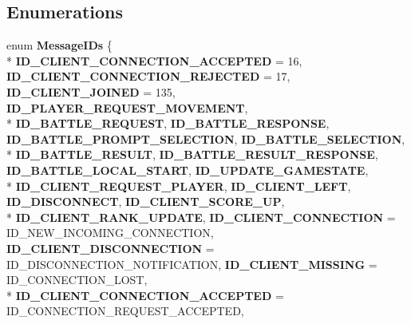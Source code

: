 \subsection*{Enumerations}
\begin{DoxyCompactItemize}
\item 
enum {\bfseries Message\-I\-Ds} \{ \\*
{\bfseries I\-D\-\_\-\-C\-L\-I\-E\-N\-T\-\_\-\-C\-O\-N\-N\-E\-C\-T\-I\-O\-N\-\_\-\-A\-C\-C\-E\-P\-T\-E\-D} = 16, 
{\bfseries I\-D\-\_\-\-C\-L\-I\-E\-N\-T\-\_\-\-C\-O\-N\-N\-E\-C\-T\-I\-O\-N\-\_\-\-R\-E\-J\-E\-C\-T\-E\-D} = 17, 
{\bfseries I\-D\-\_\-\-C\-L\-I\-E\-N\-T\-\_\-\-J\-O\-I\-N\-E\-D} = 135, 
{\bfseries I\-D\-\_\-\-P\-L\-A\-Y\-E\-R\-\_\-\-R\-E\-Q\-U\-E\-S\-T\-\_\-\-M\-O\-V\-E\-M\-E\-N\-T}, 
\\*
{\bfseries I\-D\-\_\-\-B\-A\-T\-T\-L\-E\-\_\-\-R\-E\-Q\-U\-E\-S\-T}, 
{\bfseries I\-D\-\_\-\-B\-A\-T\-T\-L\-E\-\_\-\-R\-E\-S\-P\-O\-N\-S\-E}, 
{\bfseries I\-D\-\_\-\-B\-A\-T\-T\-L\-E\-\_\-\-P\-R\-O\-M\-P\-T\-\_\-\-S\-E\-L\-E\-C\-T\-I\-O\-N}, 
{\bfseries I\-D\-\_\-\-B\-A\-T\-T\-L\-E\-\_\-\-S\-E\-L\-E\-C\-T\-I\-O\-N}, 
\\*
{\bfseries I\-D\-\_\-\-B\-A\-T\-T\-L\-E\-\_\-\-R\-E\-S\-U\-L\-T}, 
{\bfseries I\-D\-\_\-\-B\-A\-T\-T\-L\-E\-\_\-\-R\-E\-S\-U\-L\-T\-\_\-\-R\-E\-S\-P\-O\-N\-S\-E}, 
{\bfseries I\-D\-\_\-\-B\-A\-T\-T\-L\-E\-\_\-\-L\-O\-C\-A\-L\-\_\-\-S\-T\-A\-R\-T}, 
{\bfseries I\-D\-\_\-\-U\-P\-D\-A\-T\-E\-\_\-\-G\-A\-M\-E\-S\-T\-A\-T\-E}, 
\\*
{\bfseries I\-D\-\_\-\-C\-L\-I\-E\-N\-T\-\_\-\-R\-E\-Q\-U\-E\-S\-T\-\_\-\-P\-L\-A\-Y\-E\-R}, 
{\bfseries I\-D\-\_\-\-C\-L\-I\-E\-N\-T\-\_\-\-L\-E\-F\-T}, 
{\bfseries I\-D\-\_\-\-D\-I\-S\-C\-O\-N\-N\-E\-C\-T}, 
{\bfseries I\-D\-\_\-\-C\-L\-I\-E\-N\-T\-\_\-\-S\-C\-O\-R\-E\-\_\-\-U\-P}, 
\\*
{\bfseries I\-D\-\_\-\-C\-L\-I\-E\-N\-T\-\_\-\-R\-A\-N\-K\-\_\-\-U\-P\-D\-A\-T\-E}, 
{\bfseries I\-D\-\_\-\-C\-L\-I\-E\-N\-T\-\_\-\-C\-O\-N\-N\-E\-C\-T\-I\-O\-N} = I\-D\-\_\-\-N\-E\-W\-\_\-\-I\-N\-C\-O\-M\-I\-N\-G\-\_\-\-C\-O\-N\-N\-E\-C\-T\-I\-O\-N, 
{\bfseries I\-D\-\_\-\-C\-L\-I\-E\-N\-T\-\_\-\-D\-I\-S\-C\-O\-N\-N\-E\-C\-T\-I\-O\-N} = I\-D\-\_\-\-D\-I\-S\-C\-O\-N\-N\-E\-C\-T\-I\-O\-N\-\_\-\-N\-O\-T\-I\-F\-I\-C\-A\-T\-I\-O\-N, 
{\bfseries I\-D\-\_\-\-C\-L\-I\-E\-N\-T\-\_\-\-M\-I\-S\-S\-I\-N\-G} = I\-D\-\_\-\-C\-O\-N\-N\-E\-C\-T\-I\-O\-N\-\_\-\-L\-O\-S\-T, 
\\*
{\bfseries I\-D\-\_\-\-C\-L\-I\-E\-N\-T\-\_\-\-C\-O\-N\-N\-E\-C\-T\-I\-O\-N\-\_\-\-A\-C\-C\-E\-P\-T\-E\-D} = I\-D\-\_\-\-C\-O\-N\-N\-E\-C\-T\-I\-O\-N\-\_\-\-R\-E\-Q\-U\-E\-S\-T\-\_\-\-A\-C\-C\-E\-P\-T\-E\-D, 

\end{DoxyCompactItemize}
